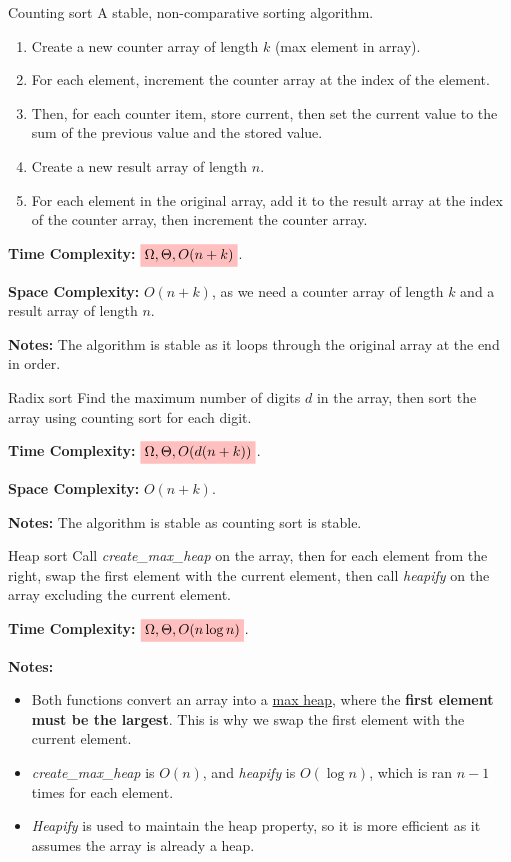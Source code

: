 \begin{knBox}
    {Counting sort}
    A stable, non-comparative sorting algorithm.
    \begin{enumerate}
        \item Create a new counter array of length $k$ (max element in array).
        \item For each element, increment the counter array at the index of the element.
        \item Then, for each counter item, store current, then set the current value to the sum of the previous value and the stored value.
        \item Create a new result array of length $n$.
        \item For each element in the original array, add it to the result array at the index of the counter array, then increment the counter array.
    \end{enumerate}

    \textbf{Time Complexity:} $\mathcolorbox{pink}{\Omega,\Theta,O(n+k)}$.

    \textbf{Space Complexity:} $O(n+k)$, as we need a counter array of length $k$ and a result array of length $n$.

    \textbf{Notes:} The algorithm is stable as it loops through the original array at the end in order.
\end{knBox}

\begin{definition}
    {Radix sort}
    Find the maximum number of digits $d$ in the array, then sort the array using counting sort for each digit.

    \textbf{Time Complexity:} $\mathcolorbox{pink}{\Omega,\Theta,O(d(n+k))}$.

    \textbf{Space Complexity:} $O(n+k)$.

    \textbf{Notes:} The algorithm is stable as counting sort is stable.
\end{definition}

\begin{definition}
    {Heap sort}
    Call \textit{create\_max\_heap} on the array, then for each element from the right, swap the first element with the current element, then call \textit{heapify} on the array excluding the current element.

    \textbf{Time Complexity:} $\mathcolorbox{pink}{\Omega,\Theta,O(n \log n)}$.

    \textbf{Notes:}
    \begin{itemize}
        \item Both functions convert an array into a \hyperref[subsubsec:heaps]{max heap}, where the \textbf{first element must be the largest}. This is why we swap the first element with the current element.
        \item \textit{create\_max\_heap} is $O(n)$, and \textit{heapify} is $O(\log n)$, which is ran $n-1$ times for each element.
        \item \textit{Heapify} is used to maintain the heap property, so it is more efficient as it assumes the array is already a heap.
    \end{itemize}
\end{definition}

\label{def:heapsort}
